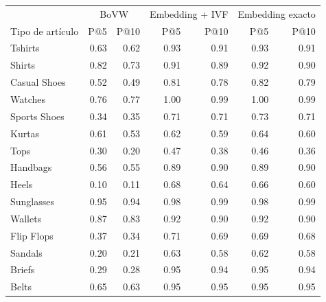 \begin{tabular}{@{}lrrrrrr@{}}
\toprule
 & \multicolumn{2}{c}{BoVW} & \multicolumn{2}{c}{Embedding + IVF} & \multicolumn{2}{c}{Embedding exacto} \\
Tipo de artículo & P@5 & P@10 & P@5 & P@10 & P@5 & P@10 \\
\midrule
Tshirts & 0.63 & 0.62 & 0.93 & 0.91 & 0.93 & 0.91 \\
Shirts & 0.82 & 0.73 & 0.91 & 0.89 & 0.92 & 0.90 \\
Casual Shoes & 0.52 & 0.49 & 0.81 & 0.78 & 0.82 & 0.79 \\
Watches & 0.76 & 0.77 & 1.00 & 0.99 & 1.00 & 0.99 \\
Sports Shoes & 0.34 & 0.35 & 0.71 & 0.71 & 0.73 & 0.71 \\
Kurtas & 0.61 & 0.53 & 0.62 & 0.59 & 0.64 & 0.60 \\
Tops & 0.30 & 0.20 & 0.47 & 0.38 & 0.46 & 0.36 \\
Handbags & 0.56 & 0.55 & 0.89 & 0.90 & 0.89 & 0.90 \\
Heels & 0.10 & 0.11 & 0.68 & 0.64 & 0.66 & 0.60 \\
Sunglasses & 0.95 & 0.94 & 0.98 & 0.99 & 0.98 & 0.99 \\
Wallets & 0.87 & 0.83 & 0.92 & 0.90 & 0.92 & 0.90 \\
Flip Flops & 0.37 & 0.34 & 0.71 & 0.69 & 0.69 & 0.68 \\
Sandals & 0.20 & 0.21 & 0.63 & 0.58 & 0.62 & 0.58 \\
Briefs & 0.29 & 0.28 & 0.95 & 0.94 & 0.95 & 0.94 \\
Belts & 0.65 & 0.63 & 0.95 & 0.95 & 0.95 & 0.95 \\
\bottomrule
\end{tabular}
